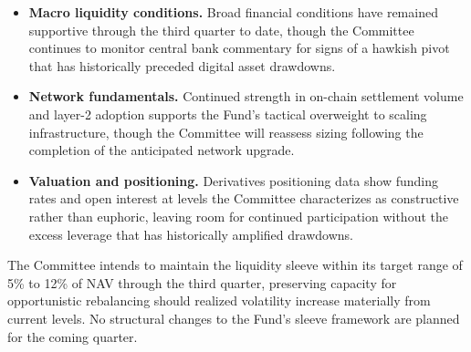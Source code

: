 \begin{itemize}[leftmargin=1.4em,itemsep=2pt,topsep=2pt]
\item \textbf{Macro liquidity conditions.} Broad financial conditions have remained supportive through the third quarter to date, though the Committee continues to monitor central bank commentary for signs of a hawkish pivot that has historically preceded digital asset drawdowns.
\item \textbf{Network fundamentals.} Continued strength in on-chain settlement volume and layer-2 adoption supports the Fund's tactical overweight to scaling infrastructure, though the Committee will reassess sizing following the completion of the anticipated network upgrade.
\item \textbf{Valuation and positioning.} Derivatives positioning data show funding rates and open interest at levels the Committee characterizes as constructive rather than euphoric, leaving room for continued participation without the excess leverage that has historically amplified drawdowns.
\end{itemize}

The Committee intends to maintain the liquidity sleeve within its target range of 5\% to 12\% of NAV through the third quarter, preserving capacity for opportunistic rebalancing should realized volatility increase materially from current levels. No structural changes to the Fund's sleeve framework are planned for the coming quarter.
